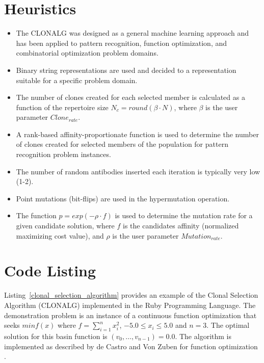 \documentclass[a4paper, 11pt]{article}
\begin{document}
\section{Heuristics}
\label{sec:heuristics}
\begin{itemize}
	\item The CLONALG was designed as a general machine learning approach and has been applied to pattern recognition, function optimization, and combinatorial optimization problem domains.
	\item Binary string representations are used and decided to a representation suitable for a specific problem domain.
	\item The number of clones created for each selected member is calculated as a function of the repertoire size $N_c=round(\beta \cdot N)$, where $\beta$ is the user parameter $Clone_{rate}$. 
	\item A rank-based affinity-proportionate function is used to determine the number of clones created for selected members of the population for pattern recognition problem instances.
	\item The number of random antibodies inserted each iteration is typically very low (1-2).
	\item Point mutations (bit-flips) are used in the hypermutation operation.
	\item The function $p=exp(-\rho \cdot f)$ is used to determine the mutation rate for a given candidate solution, where $f$ is the candidates affinity (normalized maximizing cost value), and $\rho$ is the user parameter $Mutation_{rate}$.
\end{itemize}

\section{Code Listing}
\label{sec:code}
Listing~\ref{clonal_selection_algorithm} provides an example of the Clonal Selection Algorithm (CLONALG) implemented in the Ruby Programming Language.
The demonstration problem is an instance of a continuous function optimization that seeks $min f(x)$ where $f=\sum_{i=1}^n x_{i}^2$, $-5.0\leq x_i \leq 5.0$ and $n=3$. The optimal solution for this basin function is $(v_0,\ldots,v_{n-1})=0.0$.
The algorithm is implemented as described by de Castro and Von Zuben for function optimization \cite{Castro2002a}.
\end{document}
